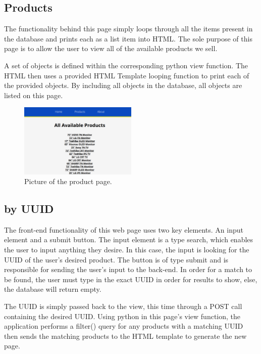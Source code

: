 \documentclass[sigconf]{acmart}
\begin{document}
\subsection{Products}\label{products}
The functionality behind this page simply loops through all the items present in the database and prints each as a list item into HTML. The sole purpose of this page is to allow the user to view all of the available products we sell. \par
A set of objects is defined within the corresponding python view function. The HTML then uses a provided HTML Template looping function to print each of the provided objects. By including all objects in the database, all objects are listed on this page.

\begin{figure}[H] %
	\centering %
	\includegraphics[width=0.5\textwidth]{Figures/allproducts.png} %
	\caption{Picture of the product page.}
\end{figure}

\subsection{by UUID}\label{uuid}
The front-end functionality of this web page uses two key elements. An input element and a submit button. The input element is a type search, which enables the user to input anything they desire. In this case, the input is looking for the UUID of the user's desired product. The button is of type submit and is responsible for sending the user's input to the back-end. In order for a match to be found, the user must type in the exact UUID in order for results to show, else, the database will return empty. \par
The UUID is simply passed back to the view, this time through a POST call containing the desired UUID. Using python in this page's view function, the application performs a filter() query for any products with a matching UUID then sends the matching products to the HTML template to generate the new page.
\end{document}
